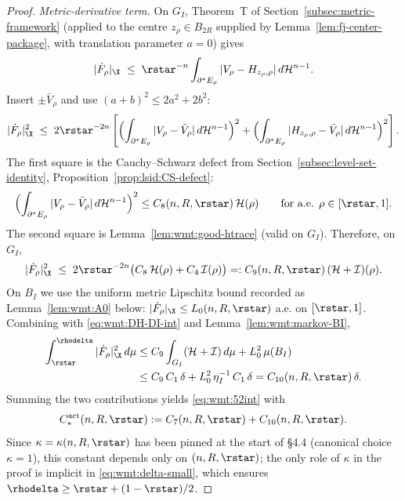 \begin{proof}
\emph{Metric-derivative term.} On $G_I$, Theorem~T of
Section~\ref{subsec:metric-framework} (applied to the centre
$z_\rho\in B_{2R}$ supplied by Lemma~\ref{lem:fj-center-package}, with
translation parameter $a=0$) gives
\begin{equation}\label{eq:wmt:M-thm-applied}
   |\dot F_\rho|_{\X}
   \;\le\; \rstar^{-n}
   \int_{\partial^*E_\rho}
       |V_\rho-H_{z_\rho,\rho}|\,d\mathcal H^{n-1}.
\end{equation}
Insert $\pm\bar V_\rho$ and use $(a+b)^2\le 2a^2+2b^2$:
\begin{equation}\label{eq:wmt:Mdot-split}
   |\dot F_\rho|_{\X}^2
   \;\le\; 2\rstar^{-2n}
   \left[
      \Bigl(\int_{\partial^*E_\rho}|V_\rho-\bar V_\rho|\,
                d\mathcal H^{n-1}\Bigr)^2
      +\Bigl(\int_{\partial^*E_\rho}|H_{z_\rho,\rho}-\bar V_\rho|\,
                d\mathcal H^{n-1}\Bigr)^2
   \right].
\end{equation}
The first square is the Cauchy--Schwarz defect from
Section~\ref{subsec:level-set-identity}, Proposition~\ref{prop:lsid:CS-defect}:
\begin{equation}\label{eq:wmt:CS-defect}
   \Bigl(\int_{\partial^*E_\rho}|V_\rho-\bar V_\rho|\,
       d\mathcal H^{n-1}\Bigr)^2
   \le C_8(n,R,\rstar)\,\mathcal H(\rho)
   \qquad\text{for a.e. }\rho\in[\rstar,1].
\end{equation}
The second square is Lemma~\ref{lem:wmt:good-htrace} (valid on $G_I$).
Therefore, on $G_I$,
\[
   |\dot F_\rho|_{\X}^2
   \;\le\; 2\rstar^{-2n}\bigl(C_8\,\mathcal H(\rho)
                              +C_4\,\mathcal I(\rho)\bigr)
   =: C_9(n,R,\rstar)\,(\mathcal H+\mathcal I)(\rho).
\]
On $B_I$ we use the uniform metric Lipschitz bound recorded as
Lemma~\ref{lem:wmt:A0} below: $|\dot F_\rho|_{\X}\le L_0(n,R,\rstar)$
a.e. on $[\rstar,1]$. Combining with \eqref{eq:wmt:DH-DI-int} and
Lemma~\ref{lem:wmt:markov-BI},
\begin{align*}
   \int_{\rstar}^{\rhodelta}|\dot F_\rho|_{\X}^2\,d\mu
   &\le C_9\int_{G_I}(\mathcal H+\mathcal I)\,d\mu
       +L_0^2\,\mu(B_I)\\
   &\le C_9\,C_1\,\delta+L_0^2\,\eta_I^{-1}\,C_1\,\delta
   = C_{10}(n,R,\rstar)\,\delta.
\end{align*}
Summing the two contributions yields \eqref{eq:wmt:52int} with
\[
   C_*^{\mathrm{act}}(n,R,\rstar):=C_7(n,R,\rstar)+C_{10}(n,R,\rstar).
\]
Since $\kappa=\kappa(n,R,\rstar)$ has been pinned at the start of \S4.4
(canonical choice $\kappa=1$), this constant depends only on
$(n,R,\rstar)$; the only role of $\kappa$ in the proof is implicit in
\eqref{eq:wmt:delta-small}, which ensures
$\rhodelta\ge\rstar+(1-\rstar)/2$.
\end{proof}

